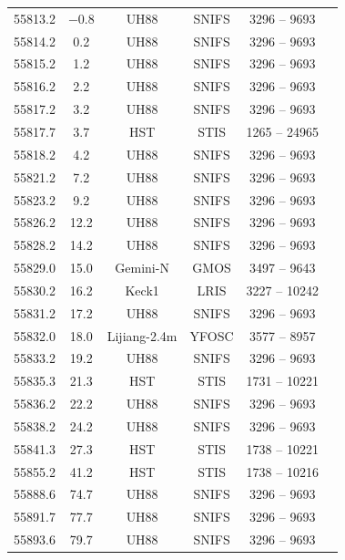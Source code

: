 \documentclass[a4paper,oneside,12pt, class=Latex/Classes/PhDthesisPSnPDF, crop=false]{standalone}
\begin{document}
\begin{longtable}{cccccc}
 55813.2 & $-$0.8 & UH88   & SNIFS & 3296 -- 9693 & \citet{spec_UH88} \\
 55814.2 & 0.2 & UH88   & SNIFS & 3296 -- 9693 & \citet{spec_UH88} \\
 55815.2 & 1.2 & UH88   & SNIFS & 3296 -- 9693 & \citet{spec_UH88} \\
 55816.2 & 2.2 & UH88   & SNIFS & 3296 -- 9693 & \citet{spec_UH88} \\
 55817.2 & 3.2 & UH88   & SNIFS & 3296 -- 9693 & \citet{spec_UH88} \\
 55817.7 & 3.7 & HST   & STIS & 1265 -- 24965 & \citet{spec_HST} \\
 55818.2 & 4.2 & UH88   & SNIFS & 3296 -- 9693 & \citet{spec_UH88} \\
 55821.2 & 7.2 & UH88   & SNIFS & 3296 -- 9693 & \citet{spec_UH88} \\
 55823.2 & 9.2 & UH88   & SNIFS & 3296 -- 9693 & \citet{spec_UH88} \\
 55826.2 & 12.2 & UH88   & SNIFS & 3296 -- 9693 & \citet{spec_UH88} \\
 55828.2 & 14.2 & UH88   & SNIFS & 3296 -- 9693 & \citet{spec_UH88} \\
 55829.0 & 15.0 & Gemini-N  & GMOS & 3497 -- 9643 & \citet{spec_Gemini-N} \\
 55830.2 & 16.2 & Keck1  & LRIS & 3227 -- 10242 & \citet{spec_Lick-3m} \\
 55831.2 & 17.2 & UH88   & SNIFS & 3296 -- 9693 & \citet{spec_UH88} \\
 55832.0 & 18.0 & Lijiang-2.4m & YFOSC & 3577 -- 8957 & \citet{spec_Lijiang-2.4m} \\
 55833.2 & 19.2 & UH88   & SNIFS & 3296 -- 9693 & \citet{spec_UH88} \\
 55835.3 & 21.3 & HST   & STIS & 1731 -- 10221 & \citet{spec_HST} \\
 55836.2 & 22.2 & UH88   & SNIFS & 3296 -- 9693 & \citet{spec_UH88} \\
 55838.2 & 24.2 & UH88   & SNIFS & 3296 -- 9693 & \citet{spec_UH88} \\
 55841.3 & 27.3 & HST   & STIS & 1738 -- 10221 & \citet{spec_HST} \\
 55855.2 & 41.2 & HST   & STIS & 1738 -- 10216 & \citet{spec_HST} \\
 55888.6 & 74.7 & UH88   & SNIFS & 3296 -- 9693 & \citet{spec_UH88} \\
 55891.7 & 77.7 & UH88   & SNIFS & 3296 -- 9693 & \citet{spec_UH88} \\
 55893.6 & 79.7 & UH88   & SNIFS & 3296 -- 9693 & \citet{spec_UH88} \\

\end{longtable}
\end{document}
